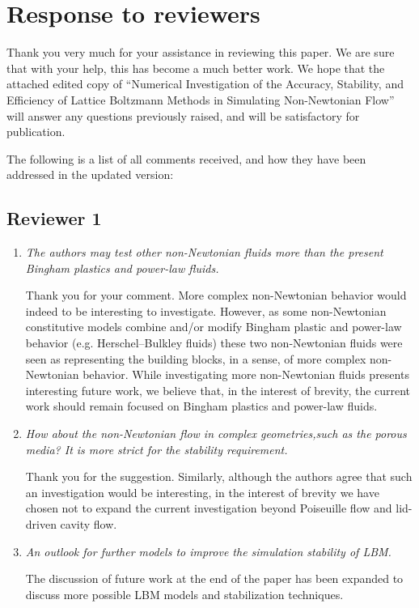 \documentclass{article}
\begin{document}
	
	
\section*{Response to reviewers}

Thank you very much for your assistance in reviewing this paper. We are sure that with your help, this has become a much better work. We hope that the attached edited copy of ``Numerical Investigation of the Accuracy, Stability, and Efficiency of Lattice Boltzmann Methods in Simulating Non-Newtonian Flow'' will answer any questions previously raised, and will be satisfactory for publication.

The following is a list of all comments received, and how they have been addressed in the updated version:

  \subsection*{Reviewer 1}
	\begin{enumerate}
		\item \emph{The authors may test other non-Newtonian fluids more than the present Bingham plastics and power-law fluids.}
		
		Thank you for your comment.
		More complex non-Newtonian behavior would indeed to be interesting to investigate.
		However, as some non-Newtonian constitutive models combine and/or modify Bingham plastic and power-law behavior (e.g. Herschel–Bulkley fluids) these two non-Newtonian fluids were seen as representing the building blocks, in a sense, of more complex non-Newtonian behavior.
		While investigating more non-Newtonian fluids presents interesting future work, we believe that, in the interest of brevity, the current work should remain focused on Bingham plastics and power-law fluids.
		
		\item \emph{How about the non-Newtonian flow in complex geometries,such as the porous media? It is more strict for the stability requirement.}
		
		Thank you for the suggestion.
		Similarly, although the authors agree that such an investigation would be interesting, in the interest of brevity we have chosen not to expand the current investigation beyond Poiseuille flow and lid-driven cavity flow.
		
		\item \emph{An outlook for further models to improve the simulation stability of LBM.}
		
		The discussion of future work at the end of the paper has been expanded to discuss more possible LBM models and stabilization techniques.
	
	\end{enumerate}
\end{document}
